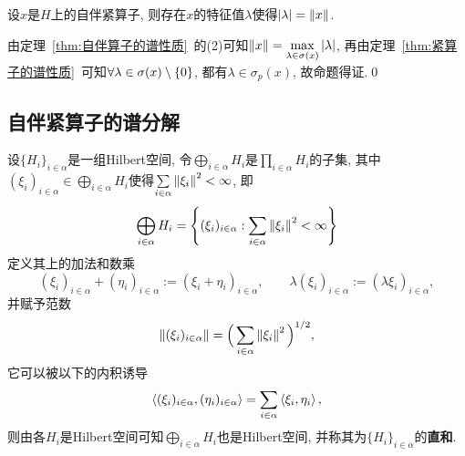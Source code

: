 	\begin{Corollary}
	设$ x $是$ H $上的自伴紧算子, 则存在$ x $的特征值$ \lambda $使得$ \left| \lambda \right| =\left\| x \right\| $.
	\end{Corollary}
	\begin{Proof}
	由定理~\ref{thm:自伴算子的谱性质}~的(2)可知$ \left\| x \right\|=\max\limits_{\lambda\in\sigma(x)}\left| \lambda \right|  $, 再由定理~\ref{thm:紧算子的谱性质}~可知$ \forall\lambda\in\sigma(x)\setminus\{0\} $, 都有$ \lambda\in\sigma_p(x) $, 故命题得证.\qed
	\end{Proof}
	
	\subsection{自伴紧算子的谱分解}
	
	\begin{Definition}[Hilbert空间的直和]
	设$ \{H_i\}_{i\in\alpha} $是一组Hilbert空间, 令$ \bigoplus\limits_{i\in\alpha}H_i $是$ \prod\limits_{i\in\alpha}H_i $的子集, 其中$ (\xi_i)_{i\in\alpha}\in\bigoplus\limits_{i\in\alpha}H_i $使得$ \sum\limits_{i\in\alpha}\left\| \xi_i \right\|^2<\infty $, 即
	\[
	\bigoplus_{i\in\alpha}H_i=\left\{ (\xi_i)_{i\in\alpha} : \sum_{i\in\alpha}\left\| \xi_i \right\|^2<\infty \right\}
	\]
	定义其上的加法和数乘
	\[
	(\xi_i)_{i\in\alpha}+(\eta_i)_{i\in\alpha}:=(\xi_i+\eta_i)_{i\in\alpha},\qquad\lambda(\xi_i)_{i\in\alpha}:=(\lambda \xi_i)_{i\in\alpha},
	\]
	并赋予范数
	\[
	\left\| (\xi_i)_{i\in\alpha} \right\|=\Big( \sum_{i\in\alpha}\left\| \xi_i \right\|^2 \Big)^{1/2},
	\]
	它可以被以下的内积诱导
	\[
	\left\langle (\xi_i)_{i\in\alpha},(\eta_i)_{i\in\alpha} \right\rangle=\sum_{i\in\alpha}\left\langle \xi_i,\eta_i \right\rangle,
	\]
	则由各$ H_i $是Hilbert空间可知$ \bigoplus\limits_{i\in\alpha}H_i $也是Hilbert空间, 并称其为$ \{ H_i \}_{i\in\alpha} $的\textbf{直和}.
	\end{Definition}
	

